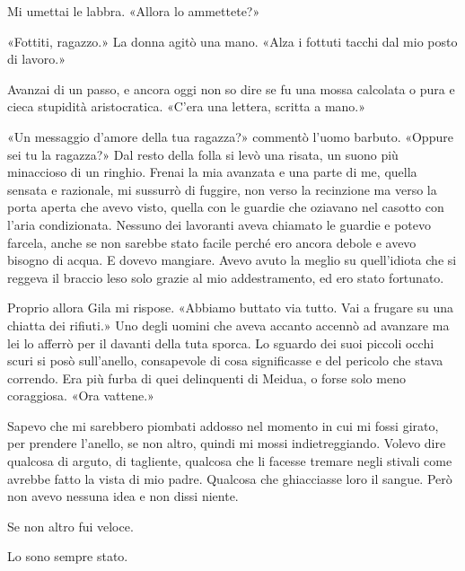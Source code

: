 Mi umettai le labbra. «Allora lo ammettete?»

«Fottiti, ragazzo.» La donna agitò una mano. «Alza i fottuti tacchi dal
mio posto di lavoro.»

Avanzai di un passo, e ancora oggi non so dire se fu una mossa calcolata
o pura e cieca stupidità aristocratica. «C'era una lettera, scritta a
mano.»

«Un messaggio d'amore della tua ragazza?» commentò l'uomo barbuto.
«Oppure sei tu la ragazza?» Dal resto della folla si levò una risata, un
suono più minaccioso di un ringhio. Frenai la mia avanzata e una parte
di me, quella sensata e razionale, mi sussurrò di fuggire, non verso la
recinzione ma verso la porta aperta che avevo visto, quella con le
guardie che oziavano nel casotto con l'aria condizionata. Nessuno dei
lavoranti aveva chiamato le guardie e potevo farcela, anche se non
sarebbe stato facile perché ero ancora debole e avevo bisogno di acqua.
E dovevo mangiare. Avevo avuto la meglio su quell'idiota che si reggeva
il braccio leso solo grazie al mio addestramento, ed ero stato
fortunato.

Proprio allora Gila mi rispose. «Abbiamo buttato via tutto. Vai a
frugare su una chiatta dei rifiuti.» Uno degli uomini che aveva accanto
accennò ad avanzare ma lei lo afferrò per il davanti della tuta sporca.
Lo sguardo dei suoi piccoli occhi scuri si posò sull'anello, consapevole
di cosa significasse e del pericolo che stava correndo. Era più furba di
quei delinquenti di Meidua, o forse solo meno coraggiosa. «Ora vattene.»

Sapevo che mi sarebbero piombati addosso nel momento in cui mi fossi
girato, per prendere l'anello, se non altro, quindi mi mossi
indietreggiando. Volevo dire qualcosa di arguto, di tagliente, qualcosa
che li facesse tremare negli stivali come avrebbe fatto la vista di mio
padre. Qualcosa che ghiacciasse loro il sangue. Però non avevo nessuna
idea e non dissi niente.

Se non altro fui veloce.

Lo sono sempre stato.


